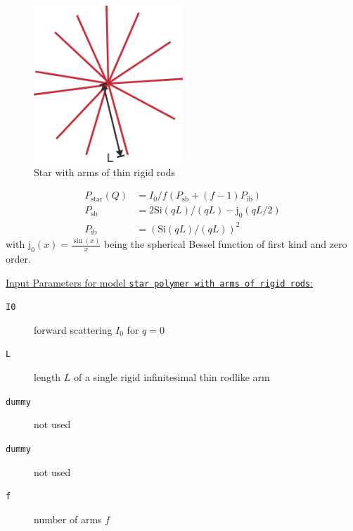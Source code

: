 \begin{figure}[htb]
\begin{center}
\includegraphics[width=0.5\textwidth]{broken_rods_star.png}
\end{center}
\caption{Star with arms of thin rigid rods} \label{fig:broken_rods_star}
\end{figure}

\begin{align}
 P_\mathrm{star}(Q) &= I_0/f\left(P_\mathrm{sb} + (f-1)P_\mathrm{ib} \right) \\
 P_\mathrm{sb} &= 2 \mathrm{Si}(qL)/(qL)-\mathrm{j}_0(qL/2) \\
 P_\mathrm{ib} &= \left( \mathrm{Si}(qL)/(qL)\right)^2
\end{align}
with $\mathrm{j}_0(x)=\frac{\sin(x)}{x}$ being the spherical Bessel function of first kind and zero order.

\vspace{5mm}

\noindent
\uline{Input Parameters for model \texttt{star polymer with arms of rigid rods}:}
\begin{description}
\item[\texttt{I0}] forward scattering $I_0$ for $q=0$
\item[\texttt{L}]length $L$ of a single rigid infinitesimal thin rodlike arm
\item[\texttt{dummy}] not used
\item[\texttt{dummy}] not used
\item[\texttt{f}] number of arms $f$
\end{description}

